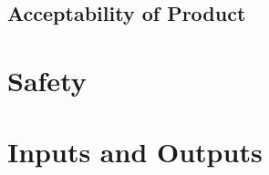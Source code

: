 \documentclass{../tex/report}
\begin{document}
\subsection{Acceptability of Product}

\section{Safety}





% 


\section{Inputs and Outputs}

\end{document}
